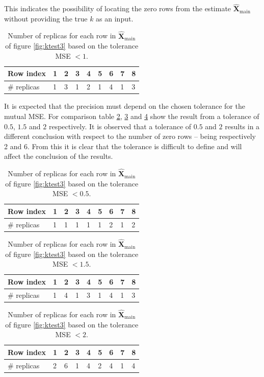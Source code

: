 This indicates the possibility of locating the zero rows from the estimate $\hat{\mathbf{X}}_{\text{main}}$ without providing the true $k$ as an input.  
\begin{table}[H]
\center
\begin{tabular}{|l|l|l|l|l|l|l|l|l|}
\hline
Row index   & 1 & 2 & 3 & 4 & 5 & 6 & 7 & 8 \\ \hline
\# replicas & 1 & 3 & 1 & 2 & 1 & 4 & 1 & 3 \\ \hline
\end{tabular}
\caption{Number of replicas for each row in $\hat{\mathbf{X}}_{\text{main}}$ of figure \ref{fig:ktest3} based on the tolerance MSE $< 1$. }
\label{tab:replica1}
\end{table}
\noindent
It is expected that the precision must depend on the chosen tolerance for the mutual MSE. 
For comparison table \ref{tab:replica2}, \ref{tab:replica3} and \ref{tab:replica4} show the result from a tolerance of $0.5$, $1.5$ and $2$ respectively. 
It is observed that a tolerance of $0.5$ and $2$ results in a different conclusion with respect to the number of zero rows -- being respectively 2 and 6. 
From this it is clear that the tolerance is difficult to define and will affect the conclusion of the results.  
\begin{table}[H]
\center
\begin{tabular}{|l|l|l|l|l|l|l|l|l|}
\hline
Row index   & 1 & 2 & 3 & 4 & 5 & 6 & 7 & 8 \\ \hline
\# replicas & 1 & 1 & 1 & 1 & 1 & 2 & 1 & 2 \\ \hline
\end{tabular}
\caption{Number of replicas for each row in $\hat{\mathbf{X}}_{\text{main}}$ of figure \ref{fig:ktest3} based on the tolerance MSE $< 0.5$.}
\label{tab:replica2}
\end{table}
\noindent
\begin{table}[H]
\center
\begin{tabular}{|l|l|l|l|l|l|l|l|l|}
\hline
Row index   & 1 & 2 & 3 & 4 & 5 & 6 & 7 & 8 \\ \hline
\# replicas & 1 & 4 & 1 & 3 & 1 & 4 & 1 & 3 \\ \hline
\end{tabular}
\caption{Number of replicas for each row in $\hat{\mathbf{X}}_{\text{main}}$ of figure \ref{fig:ktest3} based on the tolerance MSE $< 1.5$.}
\label{tab:replica3}
\end{table}
\noindent
\begin{table}[H]
\center
\begin{tabular}{|l|l|l|l|l|l|l|l|l|}
\hline
Row index   & 1 & 2 & 3 & 4 & 5 & 6 & 7 & 8 \\ \hline
\# replicas & 2 & 6 & 1 & 4 & 2 & 4 & 1 & 4 \\ \hline
\end{tabular}
\caption{Number of replicas for each row in $\hat{\mathbf{X}}_{\text{main}}$ of figure \ref{fig:ktest3} based on the tolerance MSE $< 2$.}
\label{tab:replica4}
\end{table}
